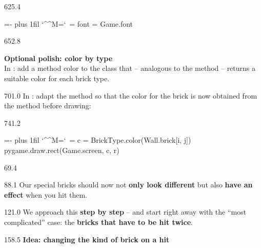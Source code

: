 \documentclass{aslab}
\makeatletter
\newenvironment{pycode}{\par\ttfamily\hyphenchar\font=-1
  \lineskiplimit=-\maxdimen\lineskip=0pt\parindent=0pt
  \parfillskip=0pt plus 1fil\relax
  \catcode`\^^M=\active\catcode`\ =\active\py@setup\py@gobble}{}
\newcommand*\emo[1]{\makebox[18bp][l]{\emoji{#1}}}
\makeatother
\begin{document}
\begin{region}[x=90.0]{625.4}
\begin{pycode}
font = Game.font
\end{pycode}
\end{region}

\begin{region}[pitch=13.5]{652.8}
\begin{tasks}[start=4]
\item \textbf{Optional polish: color by type}\\
  In : add a method color to the class 
  that -- analogous to the method  -- returns a suitable color
  for each brick type.
\end{tasks}
\end{region}

\begin{region}[x=74.7,right=0,pitch=13.5]{701.0}
In : adapt the  method so that the color for the
brick is now obtained from the  method before drawing:
\end{region}

\begin{region}[x=87.9,pitch=13.5]{741.2}
\begin{pycode}
c = BrickType.color(Wall.brick[i, j])
pygame.draw.rect(Game.screen, c, r)
\end{pycode}
\end{region}

\nextpage
\begin{region}{69.4}
\end{region}

\begin{region}[pitch=14.3]{88.1}
Our special bricks should now not \textbf{only look different} but also
\textbf{have an effect} when you hit them.
\end{region}

\begin{region}[pitch=14.3]{121.0}
We approach this \textbf{step by step} -- and start right away with the
``most complicated'' case: the \textbf{bricks that have to be hit twice}.
\end{region}

\begin{region}{158.5}
\emo{1F9E0}\textbf{Idea: changing the kind of brick on a hit}
\end{region}
\end{document}
